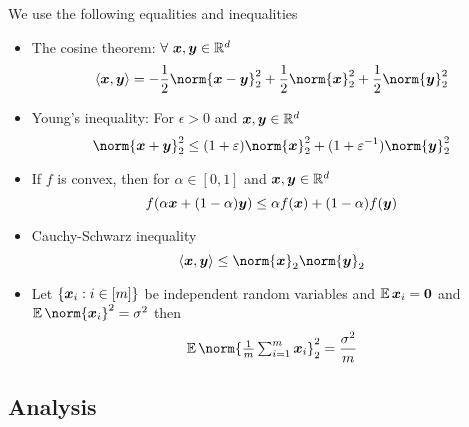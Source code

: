 \documentclass{article}
\begin{document}
\begin{lemma}
  We use the following equalities and inequalities
  \begin{itemize}[leftmargin=20pt]
    \item The cosine theorem: $\forall~\bm{x},\bm{y}\in\mathbb{R}^d$
          \begin{equation} \label{eq:cosine}
            \langle \xx, \yy \rangle
            = - \frac{1}{2} \norm{\xx - \yy}^2_2 + \frac{1}{2}\norm{\xx}_2^2 + \frac{1}{2}\norm{\yy}_2^2
          \end{equation}
    \item Young's inequality: For $\epsilon>0$ and $\bm{x},\bm{y}\in\mathbb{R}^d$
          \begin{equation}\label{eq:young}
            \norm{\xx + \yy}^2_2 \le (1+\epsilon) \norm{\xx}^2_2
            + (1+\epsilon^{-1})\norm{\yy}_2^2
          \end{equation}
    \item If $f$ is convex, then for $\alpha\in[0, 1]$ and $\bm{x}, \bm{y}\in\mathbb{R}^d$
          \begin{equation}
            \label{eq:convex}
            f(\alpha \bm{x} + (1-\alpha) \bm{y}) \le \alpha f(\bm{x}) + (1-\alpha) f(\bm{y})
          \end{equation}
    \item Cauchy-Schwarz inequality
          \begin{equation}\label{eq:cs}
            \langle \xx, \yy \rangle \le \norm{\xx}_2 \norm{\yy}_2
          \end{equation}
    \item Let $\{\bm{x}_i: i\in[m]\}$ be independent random variables
          and $\operatorname{\mathbb{E}} {\bm{x}_i}=\bm{0}$ and $\expect\norm{\xx_i}^2=\sigma^2$ then
          \begin{equation}\label{eq:random}
            \E \norm{\tfrac{1}{m}\tsum_{i=1}^m \xx_i}_2^2
            = \frac{\sigma^2}{m} %
          \end{equation}
  \end{itemize}
\end{lemma}


\subsection{Analysis}
\end{document}
